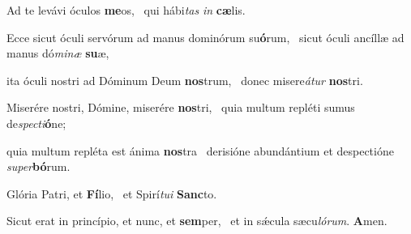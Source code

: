 \item Ad te levávi óculos \textbf{me}os,~\psstar{} qui hábi\textit{tas} \textit{in} \textbf{cæ}lis.

\item Ecce sicut óculi servórum ad manus dominórum su\textbf{ó}rum,~\psstar{} sicut óculi ancíllæ ad manus dó\textit{minæ} \textbf{su}æ,

\item ita óculi nostri ad Dóminum Deum \textbf{nos}trum,~\psstar{} donec misere\textit{átur} \textbf{nos}tri.

\item Miserére nostri, Dómine, miserére \textbf{nos}tri,~\psstar{} quia multum repléti sumus de\textit{specti}\textbf{ó}ne;

\item quia multum repléta est ánima \textbf{nos}tra~\psstar{} derisióne abundántium et despectióne \textit{super}\textbf{bó}rum.

\item Glória Patri, et \textbf{Fí}lio,~\psstar{} et Spirí\textit{tui} \textbf{Sanc}to.

\item Sicut erat in princípio, et nunc, et \textbf{sem}per,~\psstar{} et in sǽcula sæcu\textit{lórum}. \textbf{A}men.
